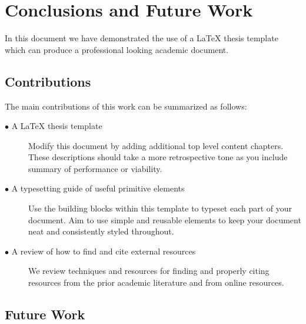 \chapter{Conclusions and Future Work}
\label{chap:conclusion}

In this document we have demonstrated the use of a LaTeX thesis template which can produce a professional looking academic document. 

\section{Contributions} 
\label{sec:conclusion_contributions}

The main contributions of this work can be summarized as follows:
\begin{description}	

	\item[$\bullet$ A LaTeX thesis template]\hfill
	
	Modify this document by adding additional top level content chapters. These descriptions should take a more retrospective tone as you include summary of performance or viability. 
	
	
	\item[$\bullet$ A typesetting guide of useful primitive elements]\hfill
	
	Use the building blocks within this template to typeset each part of your document. Aim to use simple and reusable elements to keep your document neat and consistently styled throughout.
	
	\item[$\bullet$ A review of how to find and cite external resources]\hfill
		
	We review techniques and resources for finding and properly citing resources from the prior academic literature and from online resources. 
	
\end{description}

\section{Future Work}
\label{sec:conclusion_future_work}
